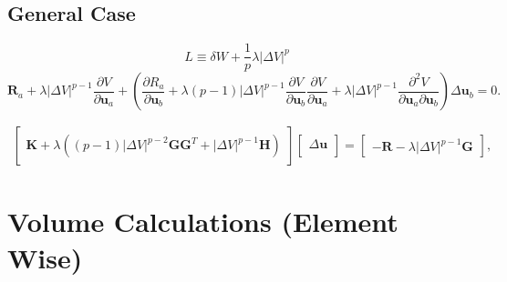 \documentclass[12pt,aps,pre]{revtex4}
\begin{document}
\subsection{General Case}
%
\begin{equation}
L \equiv \delta W + \frac{1}{p}\lambda |\Delta V|^p
\label{eq:general_Lagrangian}
\end{equation}
%
%
\begin{equation}
\pmb{R}_a + \lambda  |\Delta V|^{p-1} \frac{\partial V}{\partial \pmb{u}_a}
%
+ \left(\frac{\partial R_a}{\partial \pmb{u}_b} + \lambda(p-1)|\Delta V|^{p-1} \frac{\partial V}{\partial \pmb{u}_b} \frac{\partial V}{\partial \pmb{u}_a} + \lambda |\Delta V|^{p-1} \frac{\partial^2 V}{\partial \pmb{u}_a \partial \pmb{u}_b} \right) \Delta \pmb{u}_b  =0.
\label{eq:general_taylor-expand_feedback}
\end{equation}
%

%
\begin{eqnarray}
\begin{bmatrix}
\textbf{K} + \lambda \left((p-1)|\Delta V|^{p-2}\textbf{G} \textbf{G}^T + |\Delta V|^{p-1} \textbf{H} \right) 
\end{bmatrix}
%
\begin{bmatrix}
\Delta \textbf{u} \\
\end{bmatrix}
%
= \begin{bmatrix}
-\textbf{R}-\lambda|\Delta V|^{p-1} \textbf{G}
\end{bmatrix},
\label{eq:general_taylor-expand_matrix_feedback}
\end{eqnarray}
%

\section{Volume Calculations (Element Wise)}
\end{document}

